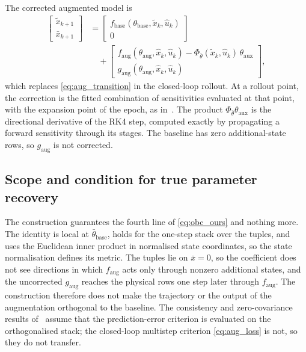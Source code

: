 The corrected augmented model is
\begin{equation}
\begin{aligned}
 \begin{bmatrix}\tilde x_{k+1}\\ \bar x_{k+1}\end{bmatrix}
 &=\begin{bmatrix}f_{\mathrm{base}}(\theta_{\mathrm{base}},\tilde x_k,\hat u_k)\\ 0\end{bmatrix}\\
 &\quad+\begin{bmatrix}f_{\mathrm{aug}}(\theta_{\mathrm{aug}},\hat x_k,\hat u_k)
   -\Phi_{\bar\theta}(\tilde x_k,\hat u_k)\,\theta_{\mathrm{aux}}\\
   g_{\mathrm{aug}}(\theta_{\mathrm{aug}},\hat x_k,\hat u_k)\end{bmatrix},
\end{aligned}
\label{eq:obc_model}
\end{equation}
which replaces \eqref{eq:aug_transition} in the closed-loop rollout.
At a rollout point, the correction is the fitted combination of sensitivities
evaluated at that point, with the expansion point of the epoch, as
in~\cite[Eq.~(13)]{gyorok2026obc}.
The product $\Phi_{\bar\theta}\theta_{\mathrm{aux}}$ is the directional
derivative of the RK4 step, computed exactly by propagating a forward
sensitivity through its stages.
The baseline has zero additional-state rows, so $g_{\mathrm{aug}}$ is not
corrected.

\subsection{Scope and condition for true parameter recovery}\label{sec:obc_scope}
The construction guarantees the fourth line of \eqref{eq:obc_ours} and nothing
more.
The identity is local at $\bar\theta_{\mathrm{base}}$, holds for the one-step
stack over the tuples, and uses the Euclidean inner product in normalised state
coordinates, so the state normalisation defines its metric.
The tuples lie on $\bar x=0$, so the coefficient does not see directions in
which $f_{\mathrm{aug}}$ acts only through nonzero additional states, and the
uncorrected $g_{\mathrm{aug}}$ reaches the physical rows one step later
through $f_{\mathrm{aug}}$.
The construction therefore does not make the trajectory or the output of the
augmentation orthogonal to the baseline.
The consistency and zero-covariance results
of~\cite[Thms.~16, 18]{gyorok2026obc} assume that the prediction-error criterion
is evaluated on the orthogonalised stack; the closed-loop multistep criterion
\eqref{eq:aug_loss} is not, so they do not transfer.

